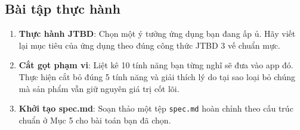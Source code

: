 \documentclass[a4paper,11pt]{article}
\begin{document}
\subsection{Bài tập thực hành}
\begin{enumerate}[label={\arabic*.}]
    \item \textbf{Thực hành JTBD}: Chọn một ý tưởng ứng dụng bạn đang ấp ủ. Hãy viết lại mục tiêu của ứng dụng theo đúng công thức JTBD 3 vế chuẩn mực.
    \item \textbf{Cắt gọt phạm vi}: Liệt kê 10 tính năng bạn từng nghĩ sẽ đưa vào app đó. Thực hiện cắt bỏ đúng 5 tính năng và giải thích lý do tại sao loại bỏ chúng mà sản phẩm vẫn giữ nguyên giá trị cốt lõi.
    \item \textbf{Khởi tạo spec.md}: Soạn thảo một tệp \texttt{spec.md} hoàn chỉnh theo cấu trúc chuẩn ở Mục 5 cho bài toán bạn đã chọn.
\end{enumerate}
\end{document}
